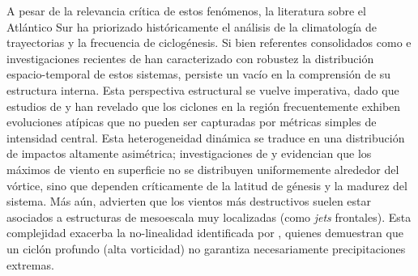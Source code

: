 A pesar de la relevancia crítica de estos fenómenos, la literatura sobre el Atlántico Sur ha priorizado históricamente el análisis de la climatología de trayectorias y la frecuencia de ciclogénesis. Si bien referentes consolidados como \citet{gramcianinov2020analysis} e investigaciones recientes de \citet{padilhareinke2026characterization} han caracterizado con robustez la distribución espacio-temporal de estos sistemas, persiste un vacío en la comprensión de su estructura interna.
Esta perspectiva estructural se vuelve imperativa, dado que estudios de \citet{gozzo2013air} y \citet{reboita2022from} han revelado que los ciclones en la región frecuentemente exhiben evoluciones atípicas que no pueden ser capturadas por métricas simples de intensidad central.
Esta heterogeneidad dinámica se traduce en una distribución de impactos altamente asimétrica; investigaciones de \citet{bitencourt2010relating} y \citet{cardoso2022synoptic} evidencian que los máximos de viento en superficie no se distribuyen uniformemente alrededor del vórtice, sino que dependen críticamente de la latitud de génesis y la madurez del sistema.
Más aún, \citet{eisenstein2023identification} advierten que los vientos más destructivos suelen estar asociados a estructuras de mesoescala muy localizadas (como \textit{jets} frontales).
Esta complejidad exacerba la no-linealidad identificada por \citet{sinclair2023relationship}, quienes demuestran que un ciclón profundo (alta vorticidad) no garantiza necesariamente precipitaciones extremas.
